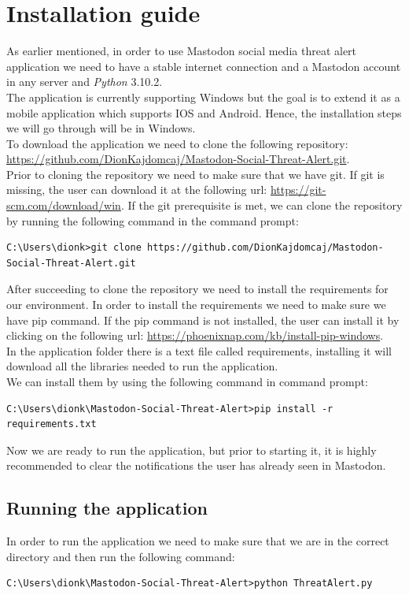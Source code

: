 \section{Installation guide}
\label{s:installation_guide}
As earlier mentioned, in order to use Mastodon social media threat alert application
we need to have a stable internet connection and a Mastodon account in any server and \textit{Python} 3.10.2.
\\[5pt]
The application is currently supporting Windows but the goal is to extend it as a 
mobile application which supports IOS and Android. Hence, the installation steps we will go through will be in Windows.
\\[5pt]
To download the application we need to clone the following repository: 
\url{https://github.com/DionKajdomcaj/Mastodon-Social-Threat-Alert.git}.
\\[5pt]
Prior to cloning the repository we need to make sure that we have git.
If git is missing, the user can download it at the
following url: \url{https://git-scm.com/download/win}.
If the git prerequisite is met, we can clone the repository by
running the following command in the command prompt:
\\[5pt]
\begin{lstlisting}[caption=Cloning the repository, captionpos=b]
	C:\Users\dionk>git clone https://github.com/DionKajdomcaj/Mastodon-Social-Threat-Alert.git
\end{lstlisting}
After succeeding to clone the repository we need to install the requirements for
our environment. In order to install the requirements we need to make sure we have
pip command. If the pip command is not installed, the user can install it by clicking
on the following url: \url{https://phoenixnap.com/kb/install-pip-windows}.
\\[5pt]
In the application folder there is a text file called requirements, installing it
will download all the libraries needed to run the application.
\\[5pt]
We can install them by using the following command in command prompt:
\\[5pt]
\begin{lstlisting}[caption=Installing requirements, captionpos=b]
	C:\Users\dionk\Mastodon-Social-Threat-Alert>pip install -r requirements.txt
\end{lstlisting}
Now we are ready to run the application, but prior to starting it,
it is highly recommended to clear the notifications the user has already
seen in Mastodon.
\subsection{Running the application}
\label{ss:running_app}
In order to run the application we need to make sure that
we are in the correct directory and then run the following command:
\\[5pt]
\begin{lstlisting}[caption=Running the application, captionpos=b]
	C:\Users\dionk\Mastodon-Social-Threat-Alert>python ThreatAlert.py 
\end{lstlisting}

